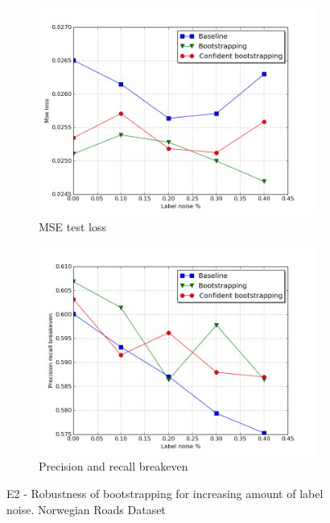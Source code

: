 \begin{figure}
\begin{subfigure}{0.5\textwidth}
\includegraphics[width=\linewidth]{figs/E5/E5_lc_noise.png}
\caption{MSE test loss} \label{fig:E2_boot_norway_loss}
\end{subfigure}
\hspace*{\fill} %
\begin{subfigure}{0.5\textwidth}
\includegraphics[width=\linewidth]{figs/E5/E5_pr_noise.png}
\caption{Precision and recall breakeven} \label{fig:E2_boot_norway_pr}
\end{subfigure}
\hspace*{\fill} %
\caption[E2 - Robustness of bootstrapping for increasing amount of label noise]{E2 - Robustness of bootstrapping for increasing amount of label noise. Norwegian Roads Dataset} \label{fig:E2_boot_norway}
\end{figure}

